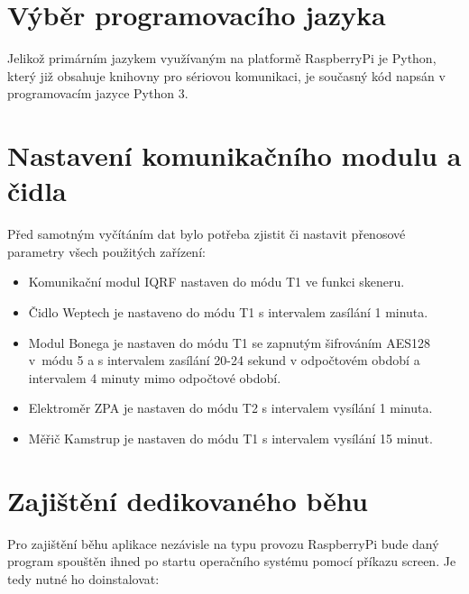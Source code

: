 \section{Výběr programovacího jazyka}
Jelikož primárním jazykem využívaným na platformě RaspberryPi je Python, který již obsahuje knihovny pro sériovou komunikaci, je současný kód napsán v programovacím jazyce Python 3.


\section{Nastavení komunikačního modulu a čidla}

Před samotným vyčítáním dat bylo potřeba zjistit či nastavit přenosové parametry všech použitých zařízení:

\begin{itemize}
	\item Komunikační modul IQRF nastaven do módu T1 ve funkci skeneru.
	\item Čidlo Weptech je nastaveno do módu T1 s intervalem zasílání 1 minuta. 
	\item Modul Bonega je nastaven do módu T1 se zapnutým šifrováním AES128 v~módu 5 a s intervalem zasílání 20-24 sekund v odpočtovém období a intervalem 4 minuty mimo odpočtové období.
	\item Elektroměr ZPA je nastaven do módu T2 s intervalem vysílání 1 minuta.
	\item Měřič Kamstrup je nastaven do módu T1 s intervalem vysílání 15 minut.
\end{itemize}


\section{Zajištění dedikovaného běhu}
Pro zajištění běhu aplikace nezávisle na typu provozu RaspberryPi bude daný program spouštěn ihned po startu operačního systému pomocí příkazu screen. Je tedy nutné ho doinstalovat:
 
